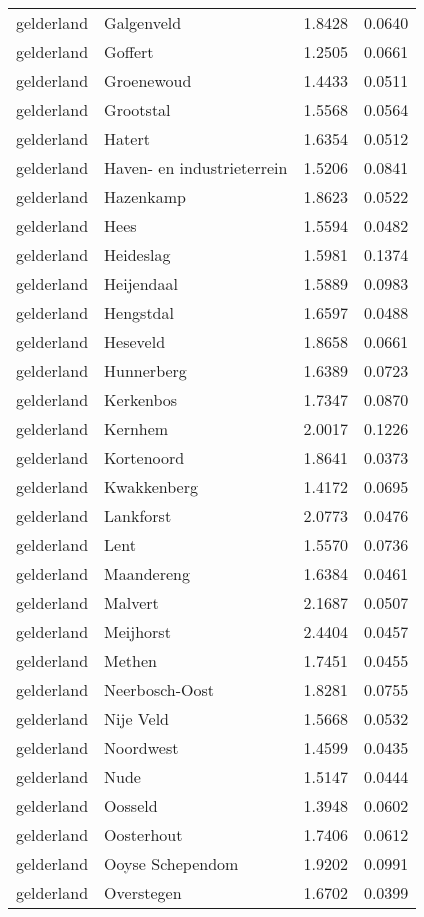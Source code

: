 \begin{longtable}{llcc}
gelderland & Galgenveld & 1.8428 & 0.0640 \\
gelderland & Goffert & 1.2505 & 0.0661 \\
gelderland & Groenewoud & 1.4433 & 0.0511 \\
gelderland & Grootstal & 1.5568 & 0.0564 \\
gelderland & Hatert & 1.6354 & 0.0512 \\
gelderland & Haven- en industrieterrein & 1.5206 & 0.0841 \\
gelderland & Hazenkamp & 1.8623 & 0.0522 \\
gelderland & Hees & 1.5594 & 0.0482 \\
gelderland & Heideslag & 1.5981 & 0.1374 \\
gelderland & Heijendaal & 1.5889 & 0.0983 \\
gelderland & Hengstdal & 1.6597 & 0.0488 \\
gelderland & Heseveld & 1.8658 & 0.0661 \\
gelderland & Hunnerberg & 1.6389 & 0.0723 \\
gelderland & Kerkenbos & 1.7347 & 0.0870 \\
gelderland & Kernhem & 2.0017 & 0.1226 \\
gelderland & Kortenoord & 1.8641 & 0.0373 \\
gelderland & Kwakkenberg & 1.4172 & 0.0695 \\
gelderland & Lankforst & 2.0773 & 0.0476 \\
gelderland & Lent & 1.5570 & 0.0736 \\
gelderland & Maandereng & 1.6384 & 0.0461 \\
gelderland & Malvert & 2.1687 & 0.0507 \\
gelderland & Meijhorst & 2.4404 & 0.0457 \\
gelderland & Methen & 1.7451 & 0.0455 \\
gelderland & Neerbosch-Oost & 1.8281 & 0.0755 \\
gelderland & Nije Veld & 1.5668 & 0.0532 \\
gelderland & Noordwest & 1.4599 & 0.0435 \\
gelderland & Nude & 1.5147 & 0.0444 \\
gelderland & Oosseld & 1.3948 & 0.0602 \\
gelderland & Oosterhout & 1.7406 & 0.0612 \\
gelderland & Ooyse Schependom & 1.9202 & 0.0991 \\
gelderland & Overstegen & 1.6702 & 0.0399 \\

\end{longtable}
